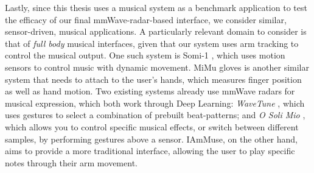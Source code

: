 Lastly, since this thesis uses a musical system as a benchmark application to test the efficacy of our final mmWave-radar-based interface, we consider similar, sensor-driven, musical applications.
A particularly relevant domain to consider is that of \textit{full body} musical interfaces, given that our system uses arm tracking to control the musical output.
One such system is Somi-1 \cite{somi-1}, which uses motion sensors to control music with dynamic movement.
MiMu gloves \cite{mimu} is another similar system that needs to attach to the user's hands, which measures finger position as well as hand motion.
Two existing systems already use mmWave radars for musical expression, which both work through Deep Learning:
\textit{WaveTune} \cite{juneja2024wavetune}, which uses gestures to select a combination of prebuilt beat-patterns; and \textit{O Soli Mio} \cite{bernado2017o_soli_mio}, which allows you to control specific musical effects, or switch between different samples, by performing gestures above a sensor.
IAmMuse, on the other hand, aims to provide a more traditional interface, allowing the user to play specific notes through their arm movement.

